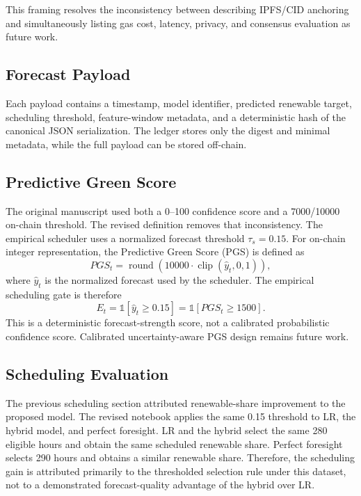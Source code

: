 \documentclass[journal]{IEEEtran}
\begin{document}
This framing resolves the inconsistency between describing IPFS/CID anchoring and simultaneously listing gas cost, latency, privacy, and consensus evaluation as future work.

\subsection{Forecast Payload}
Each payload contains a timestamp, model identifier, predicted renewable target, scheduling threshold, feature-window metadata, and a deterministic hash of the canonical JSON serialization. The ledger stores only the digest and minimal metadata, while the full payload can be stored off-chain.

\subsection{Predictive Green Score}
The original manuscript used both a 0--100 confidence score and a 7000/10000 on-chain threshold. The revised definition removes that inconsistency. The empirical scheduler uses a normalized forecast threshold $\tau_s=0.15$. For on-chain integer representation, the Predictive Green Score (PGS) is defined as
\begin{equation}
PGS_t = \operatorname{round}\left(10000 \cdot \operatorname{clip}(\hat{y}_t,0,1)\right),
\end{equation}
where $\hat{y}_t$ is the normalized forecast used by the scheduler. The empirical scheduling gate is therefore
\begin{equation}
E_t = \mathbb{1}[\hat{y}_t \ge 0.15] = \mathbb{1}[PGS_t \ge 1500].
\end{equation}
This is a deterministic forecast-strength score, not a calibrated probabilistic confidence score. Calibrated uncertainty-aware PGS design remains future work.

\subsection{Scheduling Evaluation}
The previous scheduling section attributed renewable-share improvement to the proposed model. The revised notebook applies the same 0.15 threshold to LR, the hybrid model, and perfect foresight. LR and the hybrid select the same 280 eligible hours and obtain the same scheduled renewable share. Perfect foresight selects 290 hours and obtains a similar renewable share. Therefore, the scheduling gain is attributed primarily to the thresholded selection rule under this dataset, not to a demonstrated forecast-quality advantage of the hybrid over LR.
\end{document}
